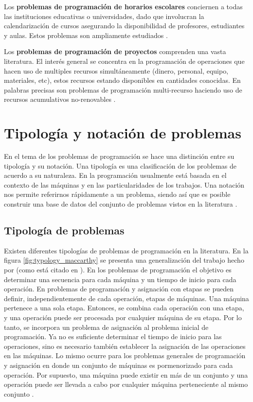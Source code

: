 \documentclass[spanish,draft,12pt,headsepline,footsepline,paper=letter]{scrreprt}
\begin{document}
Los \textbf{problemas de programación de horarios escolares} conciernen a todas las instituciones educativas o universidades, dado que involucran la calendarización de cursos asegurando la disponibilidad de profesores, estudiantes y aulas. Estos problemas son ampliamente estudiados \citep[p.~7]{TKindt2002}.

Los \textbf{problemas de programación de proyectos} comprenden una vasta literatura. El interés general se concentra en la programación de operaciones que hacen uso de multiples recursos simultáneamente (dinero, personal, equipo, materiales, etc), estos recursos estando disponibles en cantidades conocidas. En palabras precisas son problemas de programación multi-recurso haciendo uso de recursos acumulativos no-renovables \citep[p.~7]{TKindt2002}.

\section{Tipología y notación de problemas}

En el tema de los problemas de programación se hace una distinción entre su tipología y su notación. Una tipología es una clasificación de los problemas de acuerdo a su naturaleza. En la programación usualmente está basada en el contexto de las máquinas y en las particularidades de los trabajos. Una notación nos permite referirnos rápidamente a un problema, siendo así que es posible construir una base de datos del conjunto de problemas vistos en la literatura \citep[p.~14]{TKindt2002}.

\subsection{Tipología de problemas}

Existen diferentes tipologías de problemas de programación en la literatura. En la figura \ref{fig:typology_maccarthy} se presenta una generalización del trabajo hecho por \citet{maccarthy1993addressing} (como está citado en \citealp[p.~14]{TKindt2002}). En los problemas de programación el objetivo es determinar una secuencia para cada máquina y un tiempo de inicio para cada operación. En problemas de programación y asignación con etapas se pueden definir, independientemente de cada operación, etapas de máquinas. Una máquina pertenece a una sola etapa. Entonces, se combina cada operación con una etapa, y una operación puede ser procesada por cualquier máquina de su etapa. Por lo tanto, se incorpora un problema de asignación al problema inicial de programación. Ya no es suficiente determinar el tiempo de inicio para las operaciones, sino es necesario también establecer la asignación de las operaciones en las máquinas. Lo mismo ocurre para los problemas generales de programación y asignación en donde un conjunto de máquinas es pormenorizado para cada operación. Por supuesto, una máquina puede existir en más de un conjunto y una operación puede ser llevada a cabo por cualquier máquina perteneciente al mismo conjunto \citep[p.~14,~15]{TKindt2002}.
\end{document}
